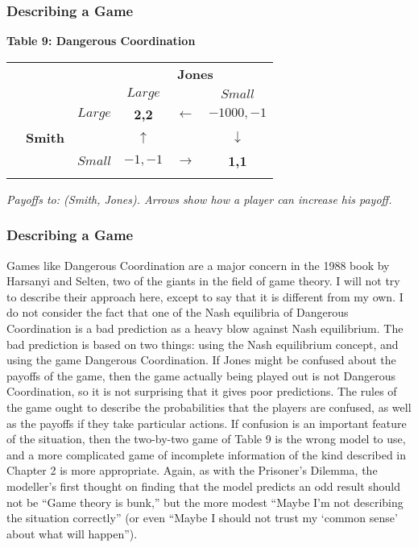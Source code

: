  \begin{frame}[fragile]\frametitle{Describing a Game}
\begin{center} {\bf Table  9:   Dangerous  Coordination   }

 \begin{tabular}{lllccc} &       &             &\multicolumn{3}{c}{\bf Jones}\\
&       &             &    $Large$  & & $Small$  \\ &   &  $Large$   &     {\bf
2,2} & $\leftarrow$  & $-1000, -1$ \\
  & {\bf Smith} &     & $\uparrow$  & & $\downarrow$ \\ &  &       $Small$     &
$-1, -1$ & $\rightarrow$  & {\bf 1,1} \\ & & & &\\
 \end{tabular} \end{center}

 {\it Payoffs  to:  (Smith, Jones). Arrows show how a player can increase his
payoff.    }

\end{frame}
 \begin{frame}[fragile]\frametitle{Describing a Game}
 
 Games like {Dangerous Coordination}  are a major concern in the 1988 book by
Harsanyi and Selten, two of the giants  in the field of game theory. I will not
try to describe their approach here, except to say that it is different from my
own. I do not consider the fact that one of the Nash equilibria of {Dangerous
Coordination}  is a bad prediction  as a heavy blow against  Nash equilibrium.
The bad prediction is based on two things: using the Nash equilibrium concept,
and using the game   Dangerous Coordination.   If Jones might   be confused
about the payoffs of the game, then the game actually being played out is  not
Dangerous Coordination, so it is not surprising that it gives poor predictions.
The rules of the game ought to describe the probabilities that the players are
confused, as well as the payoffs if they take particular actions. If confusion
is an important feature of the situation, then the two-by-two game of Table 9 is
the wrong model  to use, and a more complicated game of incomplete information
of the kind described in Chapter 2 is more appropriate.  Again, as with the
Prisoner's Dilemma,  the modeller's first thought on finding that the model
predicts an odd result should not be ``Game theory is bunk,''  but the more
modest  ``Maybe I'm not describing the situation correctly''   (or  even ``Maybe
I should not trust my `common sense' about what will happen'').

\end{frame}
